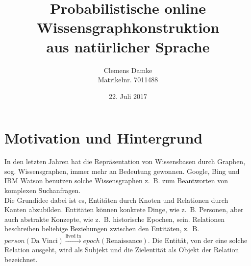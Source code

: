 \documentclass[11pt, a4paper]{scrreprt}
\begin{document}
\titlehead{Version 6}
\date{22. Juli 2017}
\subject{Bachelorarbeit Proposal}
\title{
	Probabilistische online\\
	Wissensgraphkonstruktion\\
	aus natürlicher Sprache
}
\author{
	Clemens Damke\\[1ex]
	Matrikelnr. 7011488
}
\publishers{
	{\normalsize betreut von}\\[2ex]
	Prof.~Dr.~Eyke Hüllermeier\\
	Intelligente Systeme\\
	Institut für Informatik\\
	Universität Paderborn
}
\maketitle

\section{Motivation und Hintergrund}

In den letzten Jahren hat die Repräsentation von Wissensbasen durch Graphen, sog. Wissensgraphen, immer mehr an Bedeutung gewonnen.
Google, Bing und IBM Watson benutzen solche Wissensgraphen z.~B. zum Beantworten von komplexen Suchanfragen.\\

Die Grundidee dabei ist es, Entitäten durch Knoten und Relationen durch Kanten abzubilden.
Entitäten können konkrete Dinge, wie z.~B. Personen, aber auch abstrakte Konzepte, wie z.~B. historische Epochen, sein.
Relationen beschreiben beliebige Beziehungen zwischen den Entitäten, z.~B. \(person(\text{Da~Vinci}) \xrightarrow{\text{lived~in}} epoch(\text{Renaissance})\).
Die Entität, von der eine solche Relation ausgeht, wird als Subjekt und die Zielentität als Objekt der Relation bezeichnet.\\
\end{document}
